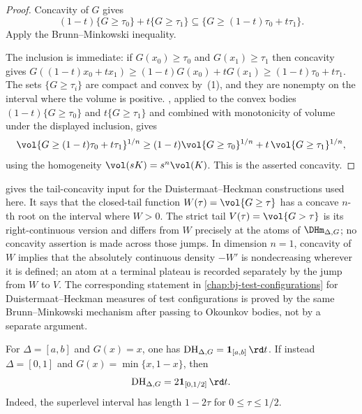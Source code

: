 \begin{proof}
Concavity of $G$ gives
\[
 (1-t)\{G\geq\tau_0\}+t\{G\geq\tau_1\}
 \subseteq
 \{G\geq(1-t)\tau_0+t\tau_1\}.
\]
Apply the Brunn--Minkowski inequality.

The inclusion is immediate: if $G(x_0)\geq\tau_0$ and $G(x_1)\geq\tau_1$ then
concavity gives
$G((1-t)x_0+tx_1)\geq(1-t)G(x_0)+tG(x_1)\geq(1-t)\tau_0+t\tau_1$.  The sets
$\{G\geq\tau_i\}$ are compact and convex by
\,(1), and they are nonempty on the interval where
the volume is positive.  , applied to the
convex bodies $(1-t)\{G\geq\tau_0\}$ and $t\{G\geq\tau_1\}$ and combined with
monotonicity of volume under the displayed inclusion, gives
\[
 \vol\{G\geq(1-t)\tau_0+t\tau_1\}^{1/n}
 \geq(1-t)\vol\{G\geq\tau_0\}^{1/n}+t\,\vol\{G\geq\tau_1\}^{1/n},
\]
using the homogeneity $\vol(sK)=s^n\vol(K)$.  This is the asserted concavity.
\end{proof}

\begin{remark}
\label{rem:dh-log-concavity}
 gives the tail-concavity input for the
Duistermaat--Heckman constructions used here.  It says that the closed-tail
function $W(\tau)=\vol\{G\geq\tau\}$ has a concave $n$-th root on the interval
where $W>0$.  The strict tail $V(\tau)=\vol\{G>\tau\}$ is its right-continuous
version and differs from $W$ precisely at the atoms of $\DHm_{\Delta,G}$; no
concavity assertion is made across those jumps.  In dimension $n=1$,
concavity of $W$ implies that the absolutely continuous density
$-W'$ is nondecreasing wherever it is defined; an atom at a terminal plateau
is recorded separately by the jump from $W$ to $V$.  The corresponding
statement in \cref{chap:bj-test-configurations} for Duistermaat--Heckman
measures of test configurations is proved by the same Brunn--Minkowski
mechanism after passing to Okounkov bodies, not by a separate argument.
\end{remark}

\begin{example}
\label{ex:dh-affine-transform}
For $\Delta=[a,b]$ and $G(x)=x$, one has
$\operatorname{DH}_{\Delta,G}=\mathbf 1_{[a,b]}\,\rd t$.  If instead
$\Delta=[0,1]$ and $G(x)=\min\{x,1-x\}$, then
\[
 \operatorname{DH}_{\Delta,G}=2\mathbf 1_{[0,1/2]}\,\rd t.
\]
Indeed, the superlevel interval has length $1-2\tau$ for
$0\leq\tau\leq1/2$.
\end{example}

